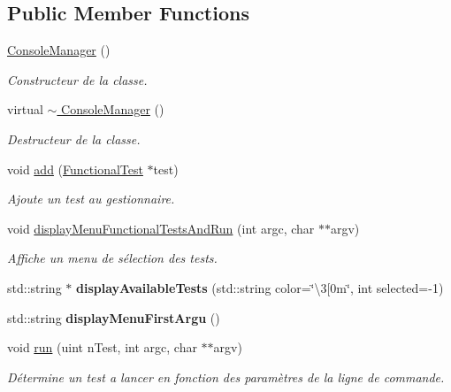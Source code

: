 \subsection*{Public Member Functions}
\begin{DoxyCompactItemize}
\item 
\mbox{\label{classConsoleManager_aa9f719ce8b6bb8c2efda952e49f534d6}} 
\hyperlink{classConsoleManager_aa9f719ce8b6bb8c2efda952e49f534d6}{Console\+Manager} ()
\begin{DoxyCompactList}\small\item\em Constructeur de la classe. \end{DoxyCompactList}\item 
\mbox{\label{classConsoleManager_a483b3fa35a693435ee115a0ebe04536d}} 
virtual \hyperlink{classConsoleManager_a483b3fa35a693435ee115a0ebe04536d}{$\sim$ Console\+Manager} ()
\begin{DoxyCompactList}\small\item\em Destructeur de la classe. \end{DoxyCompactList}\item 
void \hyperlink{classConsoleManager_aff7b3a0f19d93f25629cae84791a7084}{add} (\hyperlink{classFunctionalTest}{Functional\+Test} $\ast$test)
\begin{DoxyCompactList}\small\item\em Ajoute un test au gestionnaire. \end{DoxyCompactList}\item 
\mbox{\label{classConsoleManager_a21be37acc9749db68a3da63e703035c1}} 
void \hyperlink{classConsoleManager_a21be37acc9749db68a3da63e703035c1}{display\+Menu\+Functional\+Tests\+And\+Run} (int argc, char $\ast$$\ast$argv)
\begin{DoxyCompactList}\small\item\em Affiche un menu de sélection des tests. \end{DoxyCompactList}\item 
\mbox{\label{classConsoleManager_af43803201ea872cbf09223673662afeb}} 
std\+::string $\ast$ {\bfseries display\+Available\+Tests} (std\+::string color=\char`\"{}\textbackslash{}3\mbox{[}0m\char`\"{}, int selected=-\/1)
\item 
\mbox{\label{classConsoleManager_adf3d9ef10328d6854c13ad8130fcbee2}} 
std\+::string {\bfseries display\+Menu\+First\+Argu} ()
\item 
\mbox{\label{classConsoleManager_aeddef217e965ace2a8a1cd7bab45f2bf}} 
void \hyperlink{classConsoleManager_aeddef217e965ace2a8a1cd7bab45f2bf}{run} (uint n\+Test, int argc, char $\ast$$\ast$argv)
\begin{DoxyCompactList}\small\item\em Détermine un test a lancer en fonction des paramètres de la ligne de commande. \end{DoxyCompactList}\end{DoxyCompactItemize}
